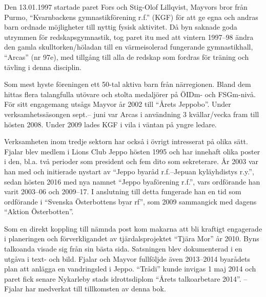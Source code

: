 Den 13.01.1997 startade paret Fors och Stig-Olof Lillqvist, Mayvors	bror från Purmo, ``Kvarnbackens gymnastikförening r.f.'' (KGF) för att ge	egna och andras barn ordnade möjligheter till nyttig fysisk aktivitet. Då byn saknade goda utrymmen för redskapsgymnastik, tog paret itu med att vintern 1997--98 ändra den gamla	skulltorken/höladan till en värmeisolerad fungerande gymnastikhall,	``Arcas'' (nr 97e), med tillgång till alla de redskap som fordras för träning och tävling i denna disciplin.

Som mest hyste föreningen ett 50-tal aktiva barn från närregionen. Bland dem hittas flera talangfulla utövare och stolta medaljörer på ÖIDm- och FSGm-nivå. För sitt engagemang utsågs Mayvor år 2002 till ``Årets Jeppobo''. Under verksamhetssäsongen sept.-- juni var Arcas i användning 3 kvällar/vecka fram till hösten 2008. Under 2009 lades KGF i vila i väntan på yngre ledare.

Verksamheten inom tredje sektorn har också i övrigt intresserat på olika sätt. Fjalar blev medlem i Lions Club Jeppo hösten 1995 och har innehaft olika poster i den, bl.a. två perioder som president och fem dito som sekreterare. År 2003 var han med och initierade	nystart av ``Jeppo byaråd r.f.--Jepuan kyläyhdistys r.y.'', sedan hösten 2016 med nya namnet ``Jeppo byaförening r.f.'', vars ordförande han varit 2003--06 och 2009--17. I anslutning till detta fungerade han en tid som ordförande i ``Svenska Österbottens byar rf'', som 2009 sammangick med dagens ``Aktion Österbotten''.

Som en direkt koppling till nämnda post kom makarna att bli kraftigt engagerade i planeringen och förverkligandet av tjärdalsprojektet ``Tjära Mor'' år 2010. Byns talkoanda visade sig från sin bästa sida.  Satsningen blev dokumenterad i en utgåva i text- och bild. Fjalar och Mayvor fullföljde även 2013--2014 byarådets plan att anlägga en vandringsled i Jeppo. ``Trådi'' kunde invigas 1 maj 2014 och paret fick senare Nykarleby stads idrottsdiplom ``Årets talkoarbetare 2014''. -- Fjalar har medverkat till tillkomsten av denna bok.



%




